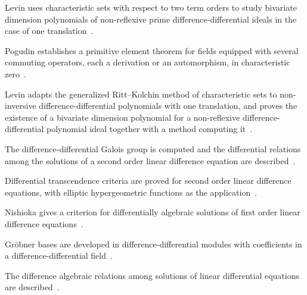 Levin uses characteristic sets with respect to two term orders to study bivariate dimension polynomials of non-reflexive prime difference-differential ideals in the case of one translation~\cite{WlBivariateDimensionPolynomialsO2018}.

Pogudin establishes a primitive element theorem for fields equipped with several commuting operators, each a derivation or an automorphism, in characteristic zero~\cite{WlAPrimitiveElementTheoremForFie2019}.

Levin adapts the generalized Ritt--Kolchin method of characteristic sets to non-inversive difference-differential polynomials with one translation, and proves the existence of a bivariate dimension polynomial for a non-reflexive difference-differential polynomial ideal together with a method computing it~\cite{WlBivariateKolchinTypeDimensionP2021}.

The difference-differential Galois group is computed and the differential relations among the solutions of a second order linear difference equation are described~\cite{WlComputationOfTheDifferenceDiff2020}.

Differential transcendence criteria are proved for second order linear difference equations, with elliptic hypergeometric functions as the application~\cite{WlDifferentialTranscendenceCrite2020}.

Nishioka gives a criterion for differentially algebraic solutions of first order linear difference equations~\cite{WlANoteOnDifferentiallyAlgebraic2020}.

Gr\"obner bases are developed in difference-differential modules with coefficients in a difference-differential field~\cite{WlGrBnerBasesInDifferenceDiffere2020}.

The difference algebraic relations among solutions of linear differential equations are described~\cite{WlDifferenceAlgebraicRelationsAm2020}.
